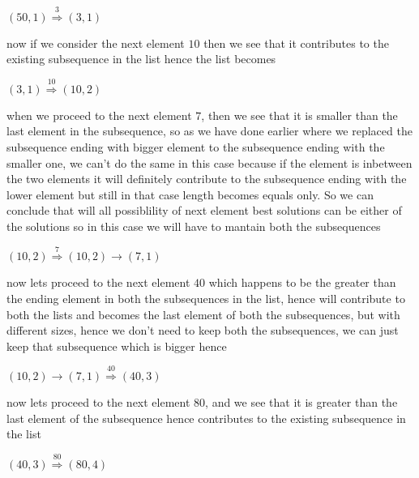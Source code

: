 \documentclass[10pt,a4paper,draft]{article}
\begin{document}
\begin{center}
$(50,1) \overset{3}{\Longrightarrow} (3,1)$
\end{center}
now if we consider the next element $10$ then we see that it contributes to the existing subsequence in the list hence the list becomes
\begin{center}
$(3,1) \overset{10}{\Longrightarrow} (10,2)$
\end{center}
when we proceed to the next element $7$, then we see that it is smaller than the last element in the subsequence, so as we have done earlier where we replaced the subsequence ending with bigger element to the subsequence ending with the smaller one, we can't do the same in this case because if the element is inbetween the two elements it will definitely contribute to the subsequence ending with the lower element but still in that case length becomes equals only. So we can conclude that will all possiblility of next element best solutions can be either of the solutions so in this case we will have to mantain both the subsequences
\begin{center}
$(10,2) \overset{7}{\Longrightarrow} (10,2) \rightarrow (7,1)$
\end{center}
now lets proceed to the next element $40$ which happens to be the greater than the ending element in both the subsequences in the list, hence will contribute to both the lists and becomes the last element of both the subsequences, but with different sizes, hence we don't need to keep both the subsequences, we can just keep that subsequence which is bigger hence
\begin{center}
$(10,2) \rightarrow (7,1) \overset{40}{\Longrightarrow} (40,3)$
\end{center}
now lets proceed to the next element $80$, and we see that it is greater than the last element of the subsequence hence contributes to the existing subsequence in the list
\begin{center}
$(40,3) \overset{80}{\Longrightarrow} (80,4)$
\end{center}
\end{document}
